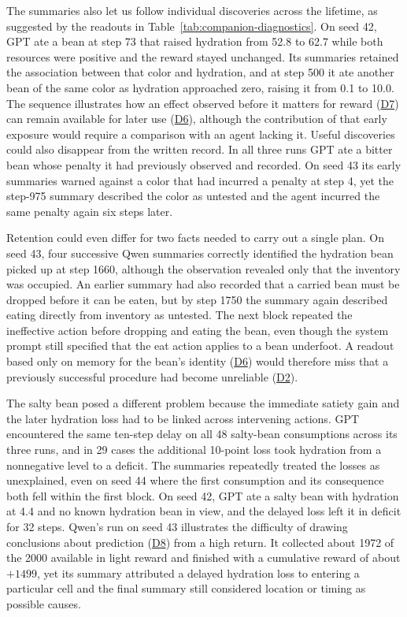 \documentclass[10pt,journal,compsoc]{IEEEtran}
\DeclareRobustCommand{\Dref}[1]{\hyperref[sec:d#1]{D#1}}
\begin{document}
The summaries also let us follow individual discoveries across the lifetime, as suggested by the readouts in Table~\ref{tab:companion-diagnostics}.
On seed 42, GPT ate a bean at step 73 that raised hydration from 52.8 to 62.7 while both resources were positive and the reward stayed unchanged.
Its summaries retained the association between that color and hydration, and at step 500 it ate another bean of the same color as hydration approached zero, raising it from 0.1 to 10.0.
The sequence illustrates how an effect observed before it matters for reward (\Dref{7}) can remain available for later use (\Dref{6}), although the contribution of that early exposure would require a comparison with an agent lacking it.
Useful discoveries could also disappear from the written record.
In all three runs GPT ate a bitter bean whose penalty it had previously observed and recorded.
On seed 43 its early summaries warned against a color that had incurred a penalty at step 4, yet the step-975 summary described the color as untested and the agent incurred the same penalty again six steps later.

Retention could even differ for two facts needed to carry out a single plan.
On seed 43, four successive Qwen summaries correctly identified the hydration bean picked up at step 1660, although the observation revealed only that the inventory was occupied.
An earlier summary had also recorded that a carried bean must be dropped before it can be eaten, but by step 1750 the summary again described eating directly from inventory as untested.
The next block repeated the ineffective action before dropping and eating the bean, even though the system prompt still specified that the eat action applies to a bean underfoot.
A readout based only on memory for the bean's identity (\Dref{6}) would therefore miss that a previously successful procedure had become unreliable (\Dref{2}).

The salty bean posed a different problem because the immediate satiety gain and the later hydration loss had to be linked across intervening actions.
GPT encountered the same ten-step delay on all 48 salty-bean consumptions across its three runs, and in 29 cases the additional 10-point loss took hydration from a nonnegative level to a deficit.
The summaries repeatedly treated the losses as unexplained, even on seed 44 where the first consumption and its consequence both fell within the first block.
On seed 42, GPT ate a salty bean with hydration at 4.4 and no known hydration bean in view, and the delayed loss left it in deficit for 32 steps.
Qwen's run on seed 43 illustrates the difficulty of drawing conclusions about prediction (\Dref{8}) from a high return.
It collected about 1972 of the 2000 available in light reward and finished with a cumulative reward of about $+1499$, yet its summary attributed a delayed hydration loss to entering a particular cell and the final summary still considered location or timing as possible causes.
\end{document}
